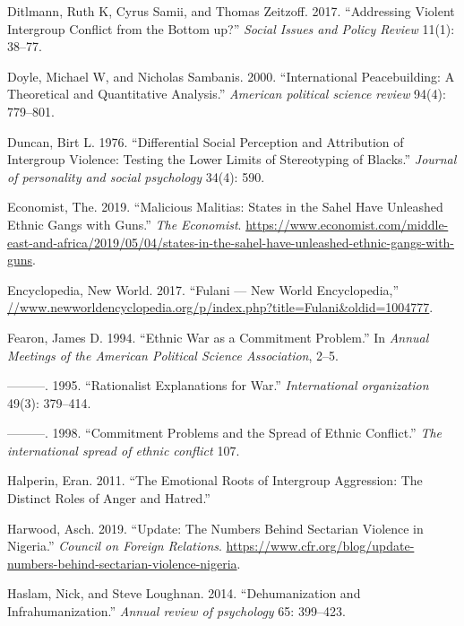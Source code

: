 \documentclass[11pt]{article}
\begin{document}
\leavevmode\hypertarget{ref-ditlmann2017addressing}{}%
Ditlmann, Ruth K, Cyrus Samii, and Thomas Zeitzoff. 2017. ``Addressing
Violent Intergroup Conflict from the Bottom up?'' \emph{Social Issues
and Policy Review} 11(1): 38--77.

\leavevmode\hypertarget{ref-doyle2000international}{}%
Doyle, Michael W, and Nicholas Sambanis. 2000. ``International
Peacebuilding: A Theoretical and Quantitative Analysis.'' \emph{American
political science review} 94(4): 779--801.

\leavevmode\hypertarget{ref-duncan1976differential}{}%
Duncan, Birt L. 1976. ``Differential Social Perception and Attribution
of Intergroup Violence: Testing the Lower Limits of Stereotyping of
Blacks.'' \emph{Journal of personality and social psychology} 34(4):
590.

\leavevmode\hypertarget{ref-economist2019militias}{}%
Economist, The. 2019. ``Malicious Malitias: States in the Sahel Have
Unleashed Ethnic Gangs with Guns.'' \emph{The Economist}.
\url{https://www.economist.com/middle-east-and-africa/2019/05/04/states-in-the-sahel-have-unleashed-ethnic-gangs-with-guns}.

\leavevmode\hypertarget{ref-fulanisize2017}{}%
Encyclopedia, New World. 2017. ``Fulani --- New World Encyclopedia,''
\url{//www.newworldencyclopedia.org/p/index.php?title=Fulani\&oldid=1004777}.

\leavevmode\hypertarget{ref-fearon1994ethnic}{}%
Fearon, James D. 1994. ``Ethnic War as a Commitment Problem.'' In
\emph{Annual Meetings of the American Political Science Association},
2--5.

\leavevmode\hypertarget{ref-fearon1995rationalist}{}%
---------. 1995. ``Rationalist Explanations for War.''
\emph{International organization} 49(3): 379--414.

\leavevmode\hypertarget{ref-fearon1998commitment}{}%
---------. 1998. ``Commitment Problems and the Spread of Ethnic
Conflict.'' \emph{The international spread of ethnic conflict} 107.

\leavevmode\hypertarget{ref-halperin2011emotional}{}%
Halperin, Eran. 2011. ``The Emotional Roots of Intergroup Aggression:
The Distinct Roles of Anger and Hatred.''

\leavevmode\hypertarget{ref-council2019nigeria}{}%
Harwood, Asch. 2019. ``Update: The Numbers Behind Sectarian Violence in
Nigeria.'' \emph{Council on Foreign Relations}.
\url{https://www.cfr.org/blog/update-numbers-behind-sectarian-violence-nigeria}.

\leavevmode\hypertarget{ref-haslam2014dehumanization}{}%
Haslam, Nick, and Steve Loughnan. 2014. ``Dehumanization and
Infrahumanization.'' \emph{Annual review of psychology} 65: 399--423.
\end{document}
